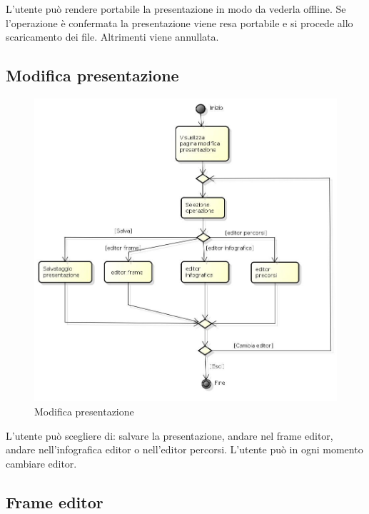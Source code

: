 L'utente può rendere portabile la presentazione in modo da vederla offline. Se l'operazione è confermata la presentazione viene resa portabile e si procede allo scaricamento dei file. Altrimenti viene annullata.

\newpage

\subsection{Modifica presentazione}

\begin{figure}[h!]
		\centering
		\includegraphics[scale=.5]{img/attivita/Modifica_presentazione.jpg}
		\caption{Modifica presentazione}
		\label{fig:Modifica_presentazione}
\end{figure}

L'utente può scegliere di: salvare la presentazione, andare nel frame editor, andare nell'infografica editor o nell'editor percorsi.
L'utente può in ogni momento cambiare editor.

\newpage

\subsection{Frame editor}

